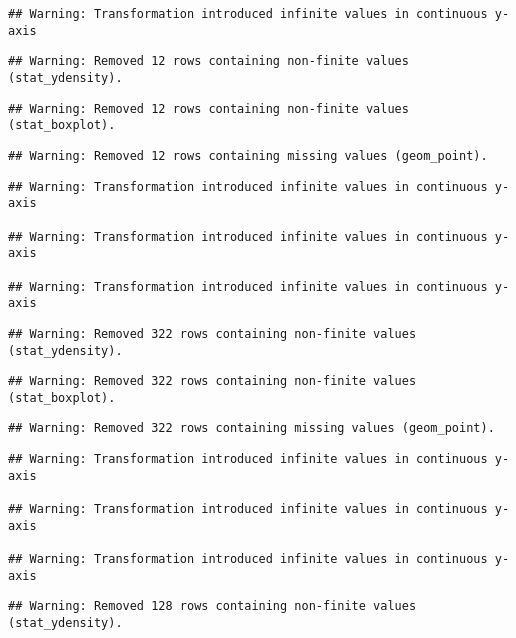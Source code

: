 \documentclass[a4paper,nobind]{templates/ociamthesis}
\begin{document}
\begin{landscape}
\begin{verbatim}
## Warning: Transformation introduced infinite values in continuous y-axis
\end{verbatim}

\begin{verbatim}
## Warning: Removed 12 rows containing non-finite values (stat_ydensity).
\end{verbatim}

\begin{verbatim}
## Warning: Removed 12 rows containing non-finite values (stat_boxplot).
\end{verbatim}

\begin{verbatim}
## Warning: Removed 12 rows containing missing values (geom_point).
\end{verbatim}

\begin{verbatim}
## Warning: Transformation introduced infinite values in continuous y-axis

## Warning: Transformation introduced infinite values in continuous y-axis

## Warning: Transformation introduced infinite values in continuous y-axis
\end{verbatim}

\begin{verbatim}
## Warning: Removed 322 rows containing non-finite values (stat_ydensity).
\end{verbatim}

\begin{verbatim}
## Warning: Removed 322 rows containing non-finite values (stat_boxplot).
\end{verbatim}

\begin{verbatim}
## Warning: Removed 322 rows containing missing values (geom_point).
\end{verbatim}

\begin{verbatim}
## Warning: Transformation introduced infinite values in continuous y-axis

## Warning: Transformation introduced infinite values in continuous y-axis

## Warning: Transformation introduced infinite values in continuous y-axis
\end{verbatim}

\begin{verbatim}
## Warning: Removed 128 rows containing non-finite values (stat_ydensity).
\end{verbatim}


\end{landscape}
\end{document}
